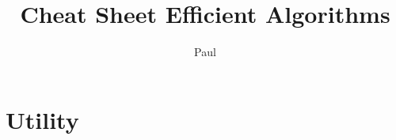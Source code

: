 \documentclass[11pt]{article}
\title{Cheat Sheet Efficient Algorithms }
\author{Paul}
\begin{document}
\maketitle

\section{Utility}


\end{document}
